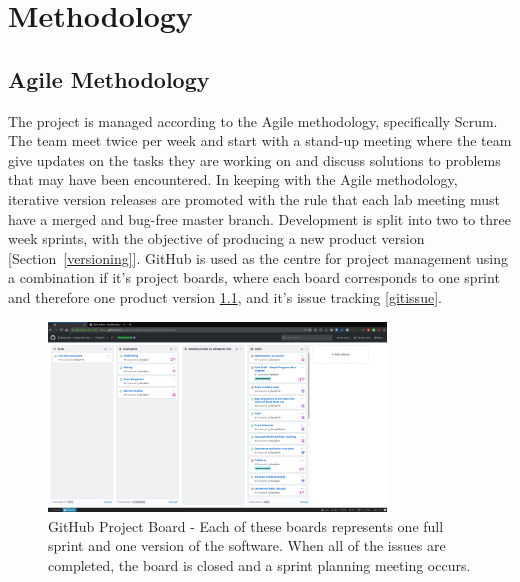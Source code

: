 \documentclass[a4paper, oneside, 11pt]{report}
\begin{document}
\chapter{Methodology}\label{methodology}

\section{Agile Methodology}\label{projectmanagement}
The project is managed according to the Agile methodology, specifically Scrum. The team meet twice per week and start with a stand-up meeting where the team give updates on the tasks they are working on and discuss solutions to problems that may have been encountered. In keeping with the Agile methodology, iterative version releases are promoted with the rule that each lab meeting must have a merged and bug-free master branch. Development is split into two to three week sprints, with the objective of producing a new product version [Section~\ref{versioning}].
GitHub is used as the centre for project management using a combination if it's project boards, where each board corresponds to one sprint and therefore one product version \ref{gitboard}, and it's issue tracking \ref{gitissue}. 

\begin{figure}[H]
	\centering
	\includegraphics[width=0.8\textwidth]{gitproj}
	\caption{GitHub Project Board - Each of these boards represents one full sprint and one version of the software. When all of the issues are completed, the board is closed and a sprint planning meeting occurs.}\label{gitboard}
\end{figure}
\end{document}
